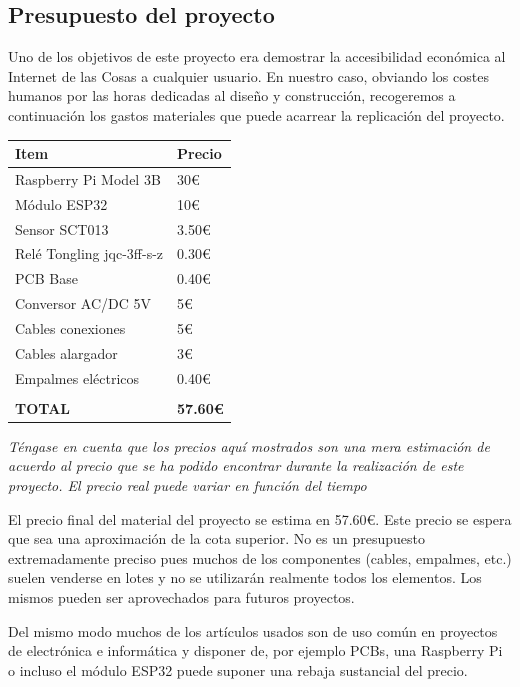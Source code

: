 \documentclass[a4paper,10pt]{article}
\begin{document}
\newpage

\subsection{Presupuesto del proyecto}

Uno de los objetivos de este proyecto era demostrar la accesibilidad
económica al Internet de las Cosas a cualquier usuario. En nuestro
caso, obviando los costes humanos por las horas dedicadas al diseño y
construcción, recogeremos a continuación los gastos materiales que
puede acarrear la replicación del proyecto.

\begin{table}[H]
  \centering
  \begin{tabular}{ll}
    Item                      & Precio \\ \hline
    Raspberry Pi Model 3B     & 30€    \\ \hline
    Módulo ESP32              & 10€    \\ \hline
    Sensor SCT013             & 3.50€  \\ \hline
    Relé Tongling jqc-3ff-s-z & 0.30€  \\ \hline
    PCB Base                  & 0.40€  \\ \hline
    Conversor AC/DC 5V        & 5€     \\ \hline
    Cables conexiones         & 5€     \\ \hline
    Cables alargador          & 3€     \\ \hline
    Empalmes eléctricos       & 0.40€  \\ \hline
    \hspace{10cm}             &        \\ \hline
    \textbf{TOTAL}            & \textbf{57.60€}
  \end{tabular}
\end{table}

\textit{Téngase en cuenta que los precios aquí mostrados son una mera
  estimación de acuerdo al precio que se ha podido encontrar durante
  la realización de este proyecto. El precio real puede variar en
  función del tiempo}

El precio final del material del proyecto se estima en 57.60€. Este
precio se espera que sea una aproximación de la cota superior. No es
un presupuesto extremadamente preciso pues muchos de los componentes
(cables, empalmes, etc.) suelen venderse en lotes y no se utilizarán
realmente todos los elementos. Los mismos pueden ser aprovechados para
futuros proyectos.

Del mismo modo muchos de los artículos usados son de uso común en
proyectos de electrónica e informática y disponer de, por ejemplo
PCBs, una Raspberry Pi o incluso el módulo ESP32 puede suponer una
rebaja sustancial del precio.

\newpage



\begingroup
\raggedright%

 
\endgroup
\end{document}
